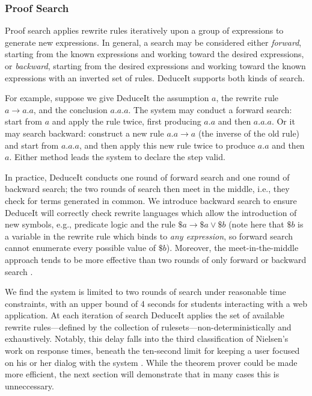 \documentclass{sigchi}
\begin{document}
\subsubsection{Proof Search}

Proof search applies rewrite rules iteratively upon a group of expressions to generate new expressions. In general, a search may be considered either \textit{forward}, starting from the known expressions and working toward the desired expressions, or \textit{backward}, starting from the desired expressions and working toward the known expressions with an inverted set of rules. DeduceIt supports both kinds of search. 

For example, suppose we give DeduceIt the assumption $a$, the rewrite rule $a \rightarrow a.a$, and the conclusion $a.a.a$. The system may conduct a forward search: start from $a$ and apply the rule twice, first producing $a.a$ and then $a.a.a$. Or it may search backward: construct a new rule $a.a \rightarrow a$ (the inverse of the old rule) and start from $a.a.a$, and then apply this new rule twice to produce $a.a$ and then $a$. Either method leads the system to declare the step valid.

In practice, DeduceIt conducts one round of forward search and one round of backward search; the two rounds of search then meet in the middle, i.e., they check for terms generated in common. We introduce backward search to ensure DeduceIt will correctly check rewrite languages which allow the introduction of new symbols, e.g., predicate logic and the rule $\$a \rightarrow \$a \vee \$b$ (note here that $\$b$ is a variable in the rewrite rule which binds to \textit{any expression}, so forward search cannot enumerate every possible value of $\$b$). Moreover, the meet-in-the-middle approach tends to be more effective than two rounds of only forward or backward search \cite{bisearch}.

We find the system is limited to two rounds of search under reasonable time constraints, with an upper bound of 4 seconds for students interacting with a web application. At each iteration of search DeduceIt applies the set of available rewrite rules---defined by the collection of rulesets---non-deterministically and exhaustively. Notably, this delay falls into the third classification of Nielsen's work on response times, beneath the ten-second limit for keeping a user focused on his or her dialog with the system \cite{neilsen}. While the theorem prover could be made more efficient, the next section will demonstrate that in many cases this is unneccessary.
\end{document}
